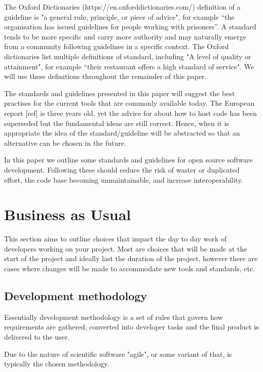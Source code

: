 \documentclass[jnr]{iosart2x}
\begin{document}
The Oxford Dictionaries (https://en.oxforddictionaries.com/) definition of a guideline is "a general rule, principle, or piece of advice", for example “the organisation has issued guidelines for people working with prisoners”.
A standard tends to be more specific and carry more authority and may naturally emerge from a community following guidelines in a specific context.
The Oxford dictionaries list multiple definitions of standard, including "A level of quality or attainment", for example “their restaurant offers a high standard of service".
We will use these definitions throughout the remainder of this paper.

The standards and guidelines presented in this paper will suggest the best practises for the current tools that are commonly available today.
The European report [ref] is three years old, yet the advice for about how to host code has been superseded but the fundamental ideas are still correct.
Hence, when it is appropriate the idea of the standard/guideline will be abstracted so that an alternative can be chosen in the future.

In this paper we outline some standards and guidelines for open source software development.
Following these should reduce the risk of waster or duplicated effort, the code base becoming unmaintainable, and increase interoperability.

\section{Business as Usual}
\label{Business as Usual}

This section aims to outline choices that impact the day to day work of developers working on your project.
Most are choices that will be made at the start of the project and ideally last the duration of the project, however there are cases where changes will be made to accommodate new tools and standards, etc.

\subsection{Development methodology}
\label{Development methodology}

Essentially development methodology is a set of rules that govern how requirements are gathered, converted into developer tasks and the final product is delivered to the user.

Due to the nature of scientific software "agile", or some variant of that, is typically the chosen methodology.
\end{document}
